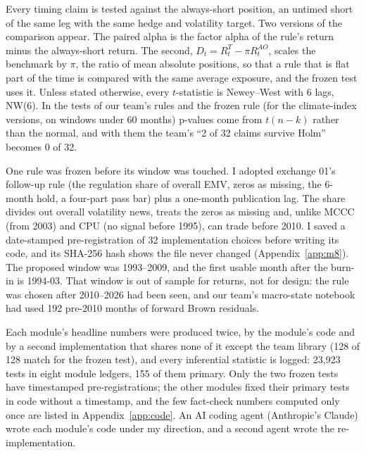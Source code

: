 Every timing claim is tested against the always-short position, an untimed short of the same leg with the same hedge and volatility target. Two versions of the comparison appear. The paired alpha is the factor alpha of the rule's return minus the always-short return. The second, $D_t=R^T_t-\pi R^{AO}_t$, scales the benchmark by $\pi$, the ratio of mean absolute positions, so that a rule that is flat part of the time is compared with the same average exposure, and the frozen test uses it. Unless stated otherwise, every $t$-statistic is Newey--West \citep{nw1987} with 6 lags, NW(6). In the tests of our team's rules and the frozen rule (for the climate-index versions, on windows under 60 months) p-values come from $t(n-k)$ rather than the normal, and with them the team's ``2 of 32 claims survive Holm'' \citep{holm1979} becomes 0 of 32.

One rule was frozen before its window was touched. I adopted exchange 01's follow-up rule (the regulation share of overall EMV, zeros as missing, the 6-month hold, a four-part pass bar) plus a one-month publication lag. The share divides out overall volatility news, treats the zeros as missing and, unlike MCCC (from 2003) and CPU (no signal before 1995), can trade before 2010. I saved a date-stamped pre-registration of 32 implementation choices before writing its code, and its SHA-256 hash shows the file never changed (Appendix~\ref{app:m8}). The proposed window was 1993--2009, and the first usable month after the burn-in is 1994-03. That window is out of sample for returns, not for design: the rule was chosen after 2010--2026 had been seen, and our team's macro-state notebook had used 192 pre-2010 months of forward Brown residuals.

Each module's headline numbers were produced twice, by the module's code and by a second implementation that shares none of it except the team library (128 of 128 match for the frozen test), and every inferential statistic is logged: 23,923 tests in eight module ledgers, 155 of them primary. Only the two frozen tests have timestamped pre-registrations; the other modules fixed their primary tests in code without a timestamp, and the few fact-check numbers computed only once are listed in Appendix~\ref{app:code}. An AI coding agent (Anthropic's Claude) wrote each module's code under my direction, and a second agent wrote the re-implementation.

